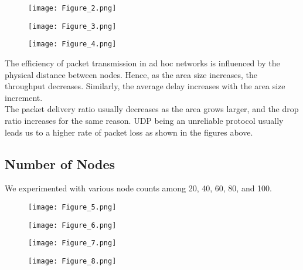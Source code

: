 \documentclass[24pt, a4paper]{article} %
\begin{document}
\begin{figure}[H]
    \centering
    \centering\texttt{[image: Figure\_2.png]}
    \label{fig:2}
\end{figure}



\begin{figure}[H]
    \centering
    \centering\texttt{[image: Figure\_3.png]}
    \label{fig:3}
\end{figure}

\begin{figure}[H]
    \centering
    \centering\texttt{[image: Figure\_4.png]}
    \label{fig:4}
\end{figure}

The efficiency of packet transmission in ad hoc networks is influenced by the physical distance between nodes. Hence, as the area size increases, the throughput decreases. Similarly, the average delay increases with the area size increment. \\

The packet delivery ratio usually decreases as the area grows larger, and the drop ratio increases for the same reason. UDP being an unreliable protocol usually leads us to a higher rate of packet loss as shown in the figures above. 

\subsection{Number of Nodes}

We experimented with various node counts among 20, 40, 60, 80, and 100.

\begin{figure}[H]
    \centering
    \centering\texttt{[image: Figure\_5.png]}
    \label{fig:5}
\end{figure}

\begin{figure}[H]
    \centering
    \centering\texttt{[image: Figure\_6.png]}
    \label{fig:6}
\end{figure}

\begin{figure}[H]
    \centering
    \centering\texttt{[image: Figure\_7.png]}
    \label{fig:7}
\end{figure}

\begin{figure}[H]
    \centering
    \centering\texttt{[image: Figure\_8.png]}
    \label{fig:8}
\end{figure}
\end{document}
